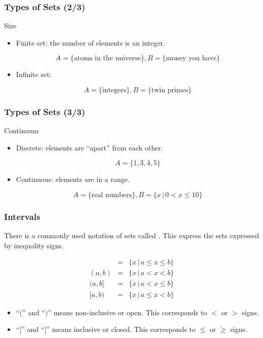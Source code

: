 \begin{frame}
\frametitle{Types of Sets (2/3)}
Size 
\begin{slide}
\begin{itemize}
\item Finite set: the number of elements is an integer. 

\[ A = \{ \text{atoms in the universe} \} , B = \{  \text{money you have} \}\]
\item Infinite set:  

\[ A = \{ \text{integers} \} , B = \{ \text{twin primes} \} \]
\end{itemize}
\end{slide}
\end{frame}

\begin{frame}
\frametitle{Types of Sets (3/3)}
Continuum
\begin{slide}
\begin{itemize}
\item Discrete: elements are ``apart'' from each other. 

\[ A = \{ 1,3,4,5\} \] 
\item Continuous: elements are in a range. 

\[ A = \{ \text{real numbers} \} , B = \{ x\, | \, 0 < x \leq 10 \} \]
\end{itemize}
\end{slide}
\end{frame}

\begin{frame}
\frametitle{Intervals}
There is a commonly used notation of sets called . This express the sets expressed by inequality signs.
\begin{defn}{}{}
\begin{eqnarray*}
[a,b] &=& \{ x \, | \, a \leq x \leq b \} \\ 
(a,b) &=& \{ x \, | \, a < x < b \} \\ 
(a,b] &=& \{ x \, | \, a < x \leq b \} \\ 
\text{[} a,b \text{)} &=& \{ x \, | \, a \leq x < b \}
\end{eqnarray*}
\end{defn}
\begin{itemize}
\item ``$($'' and ``$)$'' means non-inclusive or open. This corresponds to $<$ or $>$ signs.
\item ``$[$'' and ``$]$'' means inclusive or closed. This corresponds to $\leq$ or $\geq$ signs.
\end{itemize}
\end{frame}

